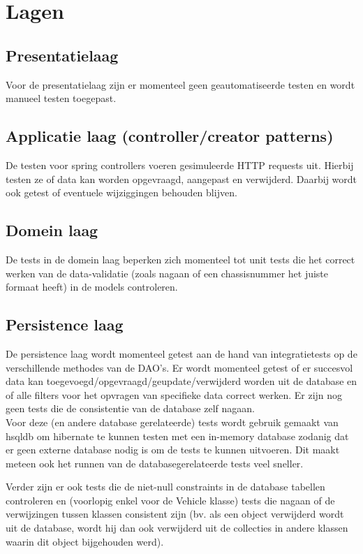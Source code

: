 \documentclass{article}
\begin{document}


\section{Lagen}
\subsection{Presentatielaag}
Voor de presentatielaag zijn er momenteel geen geautomatiseerde testen en wordt manueel testen toegepast.

\subsection{Applicatie laag (controller/creator patterns)}
De testen voor spring controllers voeren gesimuleerde HTTP requests uit. Hierbij testen ze of data kan worden opgevraagd, aangepast en verwijderd. Daarbij wordt ook getest of eventuele wijziggingen behouden blijven.

\subsection{Domein laag}
De tests in de domein laag beperken zich momenteel tot unit tests die het correct werken van de data-validatie (zoals nagaan of een chassisnummer het juiste formaat heeft) in de models controleren.

\subsection{Persistence laag}
De persistence laag wordt momenteel getest aan de hand van integratietests op de verschillende methodes van de DAO's. Er wordt momenteel getest of er succesvol data kan toegevoegd/opgevraagd/geupdate/verwijderd worden uit de database en of alle filters voor het opvragen van specifieke data correct werken. Er zijn nog geen tests die de consistentie van de database zelf nagaan.\\
Voor deze (en andere database gerelateerde) tests wordt gebruik gemaakt van hsqldb om hibernate te kunnen testen met een in-memory database zodanig dat er geen externe database nodig is om de tests te kunnen uitvoeren. Dit maakt meteen ook het runnen van de databasegerelateerde tests veel sneller. 

Verder zijn er ook tests die de niet-null constraints in de database tabellen controleren en (voorlopig enkel voor de Vehicle klasse) tests die nagaan of de verwijzingen tussen klassen consistent zijn (bv. als een object verwijderd wordt uit de database, wordt hij dan ook verwijderd uit de collecties in andere klassen waarin dit object bijgehouden werd).
\end{document}
